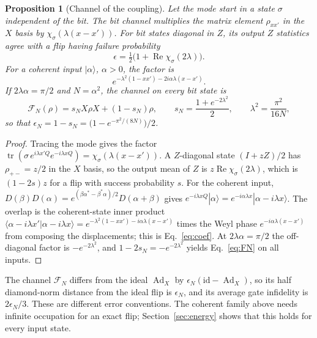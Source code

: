\documentclass[aps,pre,onecolumn,superscriptaddress,floatfix,longbibliography]{revtex4-2}
\newtheorem{proposition}[theorem]{Proposition}
\begin{document}
\begin{proposition}[Channel of the coupling]
\label{prop:channel}
Let the mode start in a state $\sigma$ independent of the bit. The bit channel multiplies the matrix element $\rho_{xx'}$ in the $X$ basis by $\chi_\sigma(\lambda(x-x'))$. For bit states diagonal in $Z$, its output $Z$ statistics agree with a flip having failure probability
\begin{equation}
\epsilon=\tfrac12\bigl(1+\operatorname{Re}\chi_\sigma(2\lambda)\bigr).
\label{eq:eps-general}
\end{equation}
For a coherent input $|\alpha\rangle$, $\alpha>0$, the factor is
\begin{equation}
e^{-\lambda^2(1-xx')-2i\alpha\lambda(x-x')}.
\label{eq:coef}
\end{equation}
If $2\lambda\alpha=\pi/2$ and $N=\alpha^2$, the channel on every bit state is
\begin{equation}
\mathcal F_N(\rho)=s_NX\rho X+(1-s_N)\rho,\qquad
s_N=\frac{1+e^{-2\lambda^2}}2,\qquad \lambda^2=\frac{\pi^2}{16N},
\label{eq:FN}
\end{equation}
so that $\epsilon_N=1-s_N=\bigl(1-e^{-\pi^2/(8N)}\bigr)/2$.
\end{proposition}

\begin{proof}
Tracing the mode gives the factor $\operatorname{tr}(\sigma\,e^{i\lambda x'Q}e^{-i\lambda xQ})=\chi_\sigma(\lambda(x-x'))$. A $Z$-diagonal state $(I+zZ)/2$ has $\rho_{+-}=z/2$ in the $X$ basis, so the output mean of $Z$ is $z\operatorname{Re}\chi_\sigma(2\lambda)$, which is $(1-2s)z$ for a flip with success probability $s$. For the coherent input, $D(\beta)D(\alpha)=e^{(\beta\alpha^*-\beta^*\alpha)/2}D(\alpha+\beta)$ gives $e^{-i\lambda xQ}|\alpha\rangle=e^{-i\alpha\lambda x}|\alpha-i\lambda x\rangle$. The overlap is the coherent-state inner product $\langle\alpha-i\lambda x'|\alpha-i\lambda x\rangle=e^{-\lambda^2(1-xx')-i\alpha\lambda(x-x')}$ times the Weyl phase $e^{-i\alpha\lambda(x-x')}$ from composing the displacements; this is Eq.~\eqref{eq:coef}. At $2\lambda\alpha=\pi/2$ the off-diagonal factor is $-e^{-2\lambda^2}$, and $1-2s_N=-e^{-2\lambda^2}$ yields Eq.~\eqref{eq:FN} on all inputs.
\end{proof}

The channel $\mathcal F_N$ differs from the ideal $\operatorname{Ad}_X$ by $\epsilon_N(\mathrm{id}-\operatorname{Ad}_X)$, so its half diamond-norm distance from the ideal flip is $\epsilon_N$, and its average gate infidelity is $2\epsilon_N/3$. These are different error conventions. The coherent family above needs infinite occupation for an exact flip; Section~\ref{sec:energy} shows that this holds for every input state.
\end{document}
